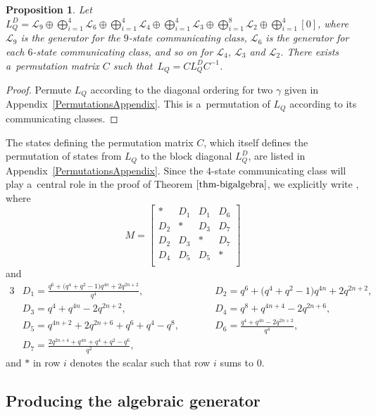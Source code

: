 \documentclass[pdftex]{sigma}
\numberwithin{equation}{section}
\newtheorem{Proposition}[Theorem]{Proposition}
\theoremstyle{definition}
\begin{document}
\begin{Proposition}
\label{DiagonalBlockOrdering}
Let $L^D_Q = \mathcal{L}_9 \oplus \bigoplus_{i=1}^4 \mathcal{L}_6 \oplus \bigoplus_{i=1}^4 \mathcal{L}_4 \oplus \bigoplus_{i=1}^4 \mathcal{L}_3 \oplus \bigoplus_{i=1}^8 \mathcal{L}_2 \oplus \bigoplus_{i=1}^4 [0]$, where~$\mathcal{L}_9$ is the generator for the $9$-state communicating class, $\mathcal{L}_6$ is the generator for each $6$-state communicating class, and so on for $\mathcal{L}_4$, $\mathcal{L}_3$ and $\mathcal{L}_2$. There exists a~permutation matrix $C$ such that~${L_Q = CL^D_QC^{-1}}$.
\end{Proposition}
\begin{proof} \label{DiagonalBlockOrderingProof}
 Permute $L_Q$ according to the diagonal ordering for two $\gamma$ given in Appendix~\ref{PermutationsAppendix}. This is a~permutation of $L_Q$ according to its communicating classes.
\end{proof}

The states defining the permutation matrix $C$, which itself defines the permutation of states from $L_Q$ to the block diagonal $L^D_Q$, are listed in Appendix~\ref{PermutationsAppendix}.
Since the $4$-state communicating class will play a~central role in the proof of Theorem $\ref{thm-bigalgebra}$, we explicitly write
,
where
\[M =
\left[
\begin{matrix}
 * & D_1 & D_1 & D_6\\
 D_2 & * & D_3 & D_7\\
 D_2 & D_3 & * & D_7\\
 D_4 & D_5 & D_5 & * \\
\end{matrix}
\right]
\]
and
\begin{alignat*}{3}
& D_1 = \frac{q^6+\bigl(q^4+q^2-1\bigr)q^{4n}+2q^{2n+2}}{q^4}, \qquad &&
 D_2 = q^6+\bigl(q^4+q^2-1\bigr)q^{4n}+2q^{2n+2},& \\
& D_3 = q^4+q^{4n}-2q^{2n+2},\qquad&&
 D_4 = q^8+q^{4n+4}-2q^{2n+6},& \\
& D_5 = q^{4n+2}+2q^{2n+6}+q^6+q^4-q^8,\qquad&&
 D_6 = \frac{q^4+q^{4n}-2q^{2n+2}}{q^4},&\\
 &D_7 = \frac{2q^{2n+4}+q^{4n}+q^4+q^2-q^6}{q^2},&&&
\end{alignat*}
and $*$ in row $i$ denotes the scalar such that row $i$ sums to 0.

\subsection{Producing the algebraic generator} \label{section--AlgebraGenerator}
\end{document}
